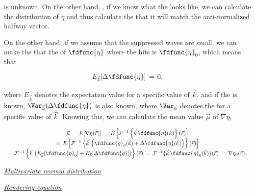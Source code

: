 {is unknown. On the other hand, , if we know what the  looks like, we can calculate the distribution of $\eta$ and thus calculate the  that it will match the anti-normalized halfway vector.

On the other hand, if we assume that the suppressed waves are small, we can make the \approximation that the  of $\fdfunc{\eta}$ where the  hits is $\fdfunc{\eta}_0$, which means that

\begin{equation}
E_{\vec{k}}[\Delta\fdfunc{\eta}] \,=\, 0,
\end{equation}

where $E_{\vec{k}}$ denotes the expectation value for a specific value of $\vec{k}$, and if the  is known, $\Var_{\vec{k}}(\Delta\fdfunc{\eta})$ is also known, where $\Var_{\vec{k}}$ denotes the \variance for a specific value of $\vec{k}$. Knowing this, we can calculate the mean value $\vec{\mu}$ of $\nabla\eta$,

\begin{equation}
\begin{array}{c}
\vec{\mu} \,=\, E[\nabla\eta(\vec{r})] \,=\, E\left[\mathcal{F}^{-1}\left\{\vec{k}\,\fdfunc{\eta}(\vec{k})\right\}(\vec{r})\right] \\
=\, E\left[\mathcal{F}^{-1}\left\{\vec{k}\,\left(\fdfunc{\eta}_0(\vec{k})+\Delta\fdfunc{\eta}(\vec{k})\right)\right\}(\vec{r})\right] \\
=\, \mathcal{F}^{-1}\left\{\vec{k}\,\left(E_{\vec{k}}[\fdfunc{\eta}_0]+E_{\vec{k}}[\Delta\fdfunc{\eta}]\right)\right\}(\vec{r}) \,=\, \mathcal{F}^{-1}\{\vec{k}\,\fdfunc{\eta}_0(\vec{k})\}(\vec{r}) \,=\, \nabla\eta_0(\vec{r})\,.
\end{array}
\end{equation}

\textit{\href{http://en.wikipedia.org/wiki/Multivariate\_normal\_distribution\#Non-degenerate\_case}{Multivariate normal distribution}}

\textit{\href{http://en.wikipedia.org/wiki/Rendering\_equation}{Rendering equation}}
}